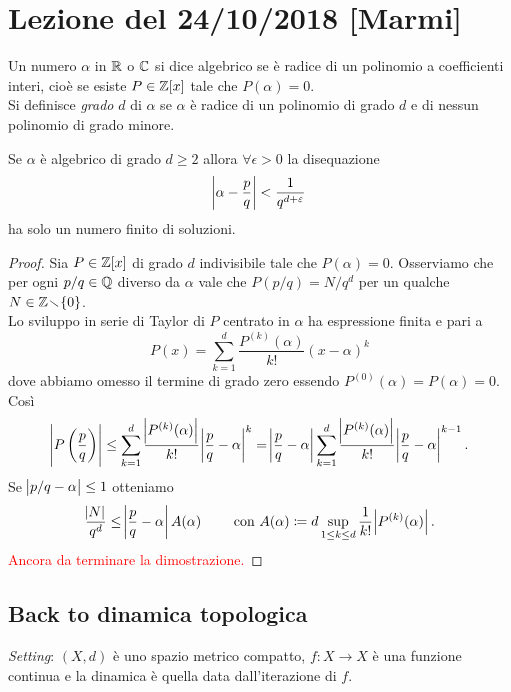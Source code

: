 \section{Lezione del 24/10/2018 [Marmi]}

\begin{definition}
	Un numero $ \alpha $ in $ \mathbb{R} $ o $ \mathbb{C} $ si dice algebrico se è radice di un polinomio a coefficienti interi, cioè se esiste $ P \in \mathbb{Z}[x] $ tale che $ P(\alpha) = 0 $. \\
	Si definisce \emph{grado} $ d $ di $ \alpha $ se $ \alpha $ è radice di un polinomio di grado $ d $ e di nessun polinomio di grado minore.  
\end{definition}

\begin{thm}[Liouville]
	Se $ \alpha $ è algebrico di grado $ d \geq 2 $ allora $ \forall \epsilon > 0 $ la disequazione
	\[
		\abs{\alpha - \frac{p}{q}} < \frac{1}{q^{d + \varepsilon}}
	\]
	ha solo un numero finito di soluzioni. 
\end{thm}
%
\begin{proof}
	Sia $ P \in \mathbb{Z}[x] $ di grado $ d $ indivisibile tale che $ P(\alpha) = 0 $. Osserviamo che per ogni $ p/q \in \mathbb{Q} $ diverso da $ \alpha $ vale che $ P(p/q) = N/q^d $ per un qualche $ N \in \mathbb{Z} \!\smallsetminus\! \{0\} $. \\
	Lo sviluppo in serie di Taylor di $ P $ centrato in $ \alpha $ ha espressione finita e pari a 
	\[
		P(x) = \sum_{k = 1}^{d} \frac{P^{(k)}(\alpha)}{k!} (x - \alpha)^k
	\]
	dove abbiamo omesso il termine di grado zero essendo $ P^{(0)}(\alpha) = P(\alpha) = 0 $. Così
	\[
		\abs{P\left(\frac{p}{q}\right)} \leq \sum_{k = 1}^{d} \frac{\abs{P^{(k)}(\alpha)}}{k!} \abs{\frac{p}{q} - \alpha}^k = \abs{\frac{p}{q} - \alpha} \sum_{k = 1}^{d} \frac{\abs{P^{(k)}(\alpha)}}{k!} \abs{\frac{p}{q} - \alpha}^{k - 1}.
	\]
	Se $ \abs{p/q - \alpha} \leq 1 $ otteniamo 
	\[
		\frac{\abs{N}}{q^d} \leq \abs{\frac{p}{q} - \alpha} A(\alpha) \qquad \text{ con } A(\alpha) \coloneqq d \sup_{1 \leq k \leq d} \frac{1}{k!} \abs{P^{(k)}(\alpha)}.
	\]
	\textcolor{red}{Ancora da terminare la dimostrazione.}
\end{proof}

\subsection{Back to dinamica topologica}
\emph{Setting}: $ (X, d) $ è uno spazio metrico compatto, $ f \colon X \to X $ è una funzione continua e la dinamica è quella data dall'iterazione di $ f $. 

